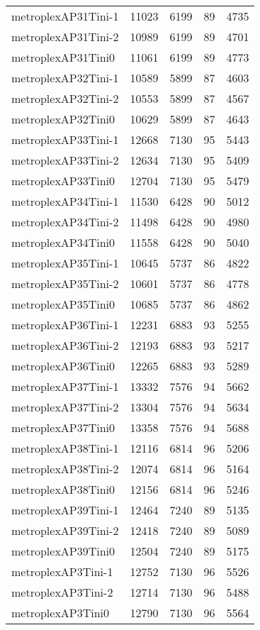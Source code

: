 \begin{longtable}{lrrrr}
metroplexAP31Tini-1 & 11023 & 6199 & 89 & 4735 \\
metroplexAP31Tini-2 & 10989 & 6199 & 89 & 4701 \\
metroplexAP31Tini0 & 11061 & 6199 & 89 & 4773 \\
metroplexAP32Tini-1 & 10589 & 5899 & 87 & 4603 \\
metroplexAP32Tini-2 & 10553 & 5899 & 87 & 4567 \\
metroplexAP32Tini0 & 10629 & 5899 & 87 & 4643 \\
metroplexAP33Tini-1 & 12668 & 7130 & 95 & 5443 \\
metroplexAP33Tini-2 & 12634 & 7130 & 95 & 5409 \\
metroplexAP33Tini0 & 12704 & 7130 & 95 & 5479 \\
metroplexAP34Tini-1 & 11530 & 6428 & 90 & 5012 \\
metroplexAP34Tini-2 & 11498 & 6428 & 90 & 4980 \\
metroplexAP34Tini0 & 11558 & 6428 & 90 & 5040 \\
metroplexAP35Tini-1 & 10645 & 5737 & 86 & 4822 \\
metroplexAP35Tini-2 & 10601 & 5737 & 86 & 4778 \\
metroplexAP35Tini0 & 10685 & 5737 & 86 & 4862 \\
metroplexAP36Tini-1 & 12231 & 6883 & 93 & 5255 \\
metroplexAP36Tini-2 & 12193 & 6883 & 93 & 5217 \\
metroplexAP36Tini0 & 12265 & 6883 & 93 & 5289 \\
metroplexAP37Tini-1 & 13332 & 7576 & 94 & 5662 \\
metroplexAP37Tini-2 & 13304 & 7576 & 94 & 5634 \\
metroplexAP37Tini0 & 13358 & 7576 & 94 & 5688 \\
metroplexAP38Tini-1 & 12116 & 6814 & 96 & 5206 \\
metroplexAP38Tini-2 & 12074 & 6814 & 96 & 5164 \\
metroplexAP38Tini0 & 12156 & 6814 & 96 & 5246 \\
metroplexAP39Tini-1 & 12464 & 7240 & 89 & 5135 \\
metroplexAP39Tini-2 & 12418 & 7240 & 89 & 5089 \\
metroplexAP39Tini0 & 12504 & 7240 & 89 & 5175 \\
metroplexAP3Tini-1 & 12752 & 7130 & 96 & 5526 \\
metroplexAP3Tini-2 & 12714 & 7130 & 96 & 5488 \\
metroplexAP3Tini0 & 12790 & 7130 & 96 & 5564 \\

\end{longtable}

